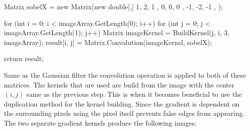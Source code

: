\begin{flushleft}
\begin{cscode}
{    Matrix sobelX = new Matrix(new double[,] {
        { 1, 2, 1 },
        { 0, 0, 0 },
        { -1, -2, -1 },
    });

    for (int i = 0; i < imageArray.GetLength(0); i++)
    {
        for (int j = 0; j < imageArray.GetLength(1); j++)
        {
            Matrix imageKernel = BuildKernel(j, i, 3, imageArray);
            result[i, j] = Matrix.Convolution(imageKernel, sobelX);
        }
    }

    return result;
}
        \end{cscode}
        
        Same as the Gaussian filter the convolution operation is applied to both of these matrices. The kernels that are used are build from the image with the center $(i,j)$ same as the previous step. This is when it becomes beneficial to use the duplication method for the kernel building. Since the gradient is dependent on the surrounding pixels using the pixel itself prevents false edges from appearing. The two separate gradient kernels produce the following images:
        
        \begin{figure}[H]
            \centering
            \label{fig:proto_gradX}
            \qquad
            \label{fig:proto_gradY}
        \end{figure} \bk
        

\end{flushleft}
